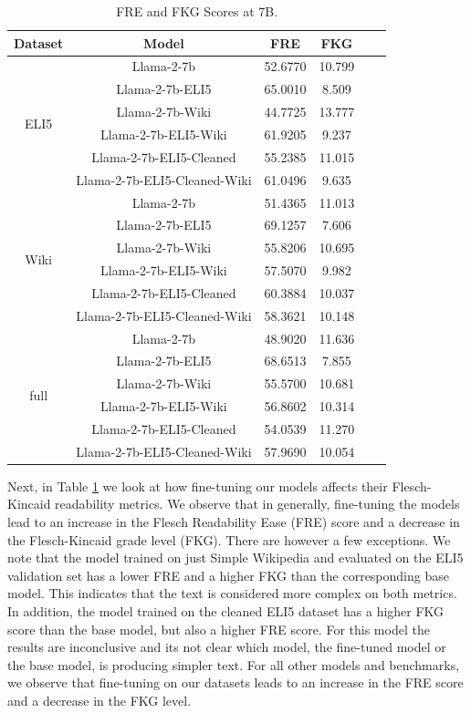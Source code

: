 \documentclass[11pt, oneside]{article}   	%
\begin{document}

\begin{table}[h]
\centering
\begin{tabular}{cccccc}
\hline
Dataset & Model & FRE & FKG \\
\hline
\multirow{6}{*}{ELI5} & Llama-2-7b & 52.6770 & 10.799 \\
 & Llama-2-7b-ELI5 & 65.0010 & 8.509 \\
 & Llama-2-7b-Wiki & 44.7725 & 13.777 \\
 & Llama-2-7b-ELI5-Wiki & 61.9205 & 9.237 \\
  & Llama-2-7b-ELI5-Cleaned & 55.2385 & 11.015 \\
 & Llama-2-7b-ELI5-Cleaned-Wiki & 61.0496 & 9.635 \\
\hline
\multirow{6}{*}{Wiki} & Llama-2-7b & 51.4365 & 11.013 \\
 & Llama-2-7b-ELI5 & 69.1257 & 7.606 \\
 & Llama-2-7b-Wiki & 55.8206 & 10.695 \\
 & Llama-2-7b-ELI5-Wiki & 57.5070 & 9.982 \\
  & Llama-2-7b-ELI5-Cleaned & 60.3884 & 10.037 \\
 & Llama-2-7b-ELI5-Cleaned-Wiki & 58.3621 & 10.148 \\
\hline
\multirow{6}{*}{full} & Llama-2-7b & 48.9020 & 11.636 \\
 & Llama-2-7b-ELI5 & 68.6513 & 7.855 \\
 & Llama-2-7b-Wiki & 55.5700 & 10.681 \\
 & Llama-2-7b-ELI5-Wiki & 56.8602 & 10.314 \\
  & Llama-2-7b-ELI5-Cleaned & 54.0539 & 11.270 \\
 & Llama-2-7b-ELI5-Cleaned-Wiki & 57.9690 & 10.054 \\
\hline
\end{tabular}
\caption{FRE and FKG Scores at 7B.}
\label{tab:flesch_scores_7B}
\end{table}
Next, in Table \ref{tab:flesch_scores_7B} we look at how fine-tuning our models affects their Flesch-Kincaid readability metrics.
We observe that in generally, fine-tuning the models lead to an increase in the Flesch Readability Ease (FRE) score and a decrease in the Flesch-Kincaid grade level (FKG). 
There are however a few exceptions.
We note that the model trained on just Simple Wikipedia and evaluated on the ELI5 validation set has a lower FRE and a higher FKG than the corresponding base model.
This indicates that the text is considered more complex on both metrics.
In addition, the model trained on the cleaned ELI5 dataset has a higher FKG score than the base model, but also a higher FRE score.
For this model the results are inconclusive and its not clear which model, the fine-tuned model or the base model, is producing simpler text.
For all other models and benchmarks, we observe that fine-tuning on our datasets leads to an increase in the FRE score and a decrease in the FKG level.
\end{document}
